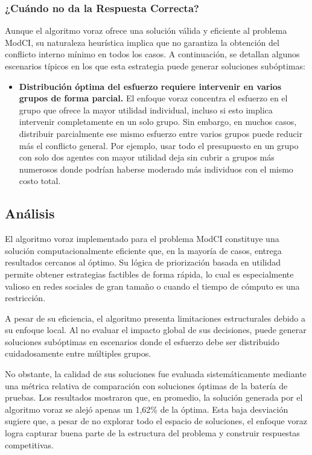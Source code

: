 \documentclass[11pt,letter]{article}
\begin{document}
        \subsubsection{¿Cuándo no da la Respuesta Correcta?}
    
    Aunque el algoritmo voraz ofrece una solución válida y eficiente al problema ModCI, su naturaleza heurística implica que no garantiza la obtención del conflicto interno mínimo en todos los casos. A continuación, se detallan algunos escenarios típicos en los que esta estrategia puede generar soluciones subóptimas:
    
    
    \begin{itemize}
    
    \item \textbf{Distribución óptima del esfuerzo requiere intervenir en varios grupos de forma parcial.}  
    El enfoque voraz concentra el esfuerzo en el grupo que ofrece la mayor utilidad individual, incluso si esto implica intervenir completamente en un solo grupo. Sin embargo, en muchos casos, distribuir parcialmente ese mismo esfuerzo entre varios grupos puede reducir más el conflicto general. Por ejemplo, usar todo el presupuesto en un grupo con solo dos agentes con mayor utilidad deja sin cubrir a grupos más numerosos donde podrían haberse moderado más individuos con el mismo costo total.
    
    \end{itemize}
    
        
    
    
    \subsection{Análisis}
    El algoritmo voraz implementado para el problema ModCI constituye una solución computacionalmente eficiente que, en la mayoría de casos, entrega resultados cercanos al óptimo. Su lógica de priorización basada en utilidad permite obtener estrategias factibles de forma rápida, lo cual es especialmente valioso en redes sociales de gran tamaño o cuando el tiempo de cómputo es una restricción.
    
    A pesar de su eficiencia, el algoritmo presenta limitaciones estructurales debido a su enfoque local. Al no evaluar el impacto global de sus decisiones, puede generar soluciones subóptimas en escenarios donde el esfuerzo debe ser distribuido cuidadosamente entre múltiples grupos.
    
    No obstante, la calidad de sus soluciones fue evaluada sistemáticamente mediante una métrica relativa de comparación con soluciones óptimas de la batería de pruebas. Los resultados mostraron que, en promedio, la solución generada por el algoritmo voraz se alejó apenas un 1{,}62\% de la óptima. Esta baja desviación sugiere que, a pesar de no explorar todo el espacio de soluciones, el enfoque voraz logra capturar buena parte de la estructura del problema y construir respuestas competitivas.
    
\end{document}
